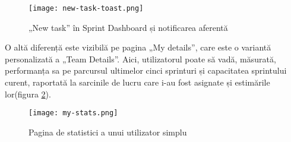  \begin{figure}[H]
	\centering
 	 \texttt{[image: new-task-toast.png]}
	\caption{„New task” în Sprint Dashboard și notificarea aferentă}
	\label{fig:new-task-toast}
 \end{figure}

O altă diferență este vizibilă pe pagina „My details”, care este o variantă personalizată a „Team Details”. Aici, utilizatorul poate să vadă, măsurată, performanța sa pe parcursul ultimelor cinci sprinturi și capacitatea sprintului curent, raportată la sarcinile de lucru care i-au fost asignate și estimările lor(figura \ref{fig:my-stats}).

 \begin{figure}[H]
	\centering
 	 \texttt{[image: my-stats.png]}
	\caption{Pagina de statistici a unui utilizator simplu}
	\label{fig:my-stats}
 \end{figure}
